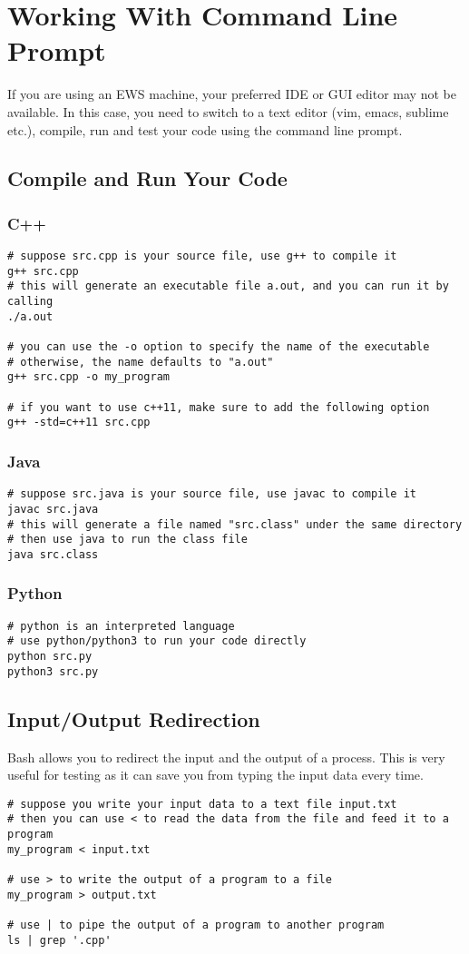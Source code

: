 \documentclass {article}
\begin{document}
\newpage
\section{Working With Command Line Prompt}
If you are using an EWS machine, your preferred IDE or GUI editor may not be
available. In this case, you need to switch to a text editor (vim, emacs,
sublime etc.), compile, run and test your code using the command line prompt.
\subsection{Compile and Run Your Code}
\subsubsection{C++}
\begin{verbatim}
# suppose src.cpp is your source file, use g++ to compile it
g++ src.cpp
# this will generate an executable file a.out, and you can run it by calling
./a.out

# you can use the -o option to specify the name of the executable
# otherwise, the name defaults to "a.out"
g++ src.cpp -o my_program

# if you want to use c++11, make sure to add the following option
g++ -std=c++11 src.cpp
\end{verbatim}

\subsubsection{Java}
\begin{verbatim}
# suppose src.java is your source file, use javac to compile it
javac src.java
# this will generate a file named "src.class" under the same directory
# then use java to run the class file
java src.class
\end{verbatim}

\subsubsection{Python}
\begin{verbatim}
# python is an interpreted language
# use python/python3 to run your code directly
python src.py
python3 src.py
\end{verbatim}

\newpage
\subsection{Input/Output Redirection}
Bash allows you to redirect the input and the output of a process.
This is very useful for testing as it can save you from typing 
the input data every time.\\
\begin{verbatim}
# suppose you write your input data to a text file input.txt
# then you can use < to read the data from the file and feed it to a program
my_program < input.txt

# use > to write the output of a program to a file
my_program > output.txt

# use | to pipe the output of a program to another program
ls | grep '.cpp'
\end{verbatim}
\end{document}
